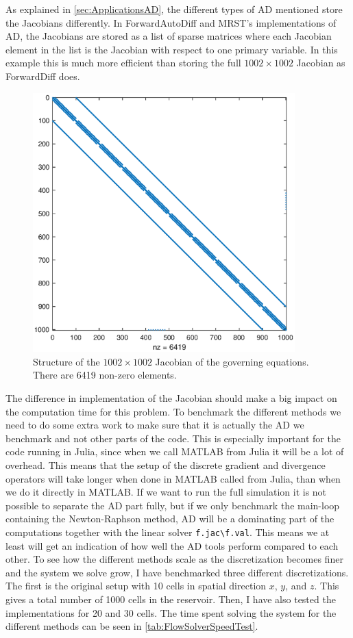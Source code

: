 As explained in \autoref{sec:ApplicationsAD}, the different types of AD mentioned store the Jacobians differently. In ForwardAutoDiff and MRST's implementations of AD, the Jacobians are stored as a list of sparse matrices where each Jacobian element in the list is the Jacobian with respect to one primary variable. In this example this is much more efficient than storing the full $1002\times 1002$ Jacobian as ForwardDiff does.
\begin{figure}[htbp]
    \centering
    \includegraphics[width = 0.9\textwidth]{figures/flowSolver_Jacobian.eps}
    \caption{Structure of the $1002\times 1002$ Jacobian of the governing equations. There are 6419 non-zero elements.}
    \label{fig:flowSolverJacobian}
\end{figure}
The difference in implementation of the Jacobian should make a big impact on the computation time for this problem. To benchmark the different methods we need to do some extra work to make sure that it is actually the AD we benchmark and not other parts of the code. This is especially important for the code running in Julia, since when we call MATLAB from Julia it will be a lot of overhead. This means that the setup of the discrete gradient and divergence operators will take longer when done in MATLAB called from Julia, than when we do it directly in MATLAB. If we want to run the full simulation it is not possible to separate the AD part fully, but if we only benchmark the main-loop containing the Newton-Raphson method, AD will be a dominating part of the computations together with the linear solver \texttt{f.jac\textbackslash f.val}. This means we at least will get an indication of how well the AD tools perform compared to each other. To see how the different methods scale as the discretization becomes finer and the system we solve grow, I have benchmarked three different discretizations. The first is the original setup with 10 cells in spatial direction $x$, $y$, and $z$. This gives a total number of 1000 cells in the reservoir. Then, I have also tested the implementations for 20 and 30 cells. The time spent solving the system for the different methods can be seen in \autoref{tab:FlowSolverSpeedTest}.
